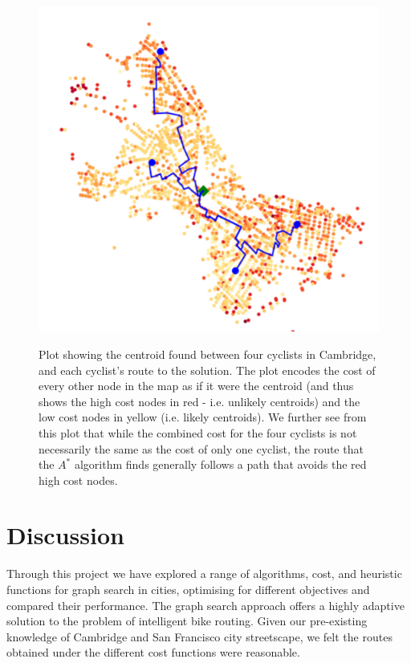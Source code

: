 \documentclass[11pt]{article}
\begin{document}
\begin{figure}[H]
\caption{Plot showing the centroid found between four cyclists in Cambridge, and each cyclist's route to the solution. The plot encodes the cost of every other node in the map as if it were the centroid (and thus shows the high cost nodes in red - i.e. unlikely centroids) and the low cost nodes in yellow (i.e. likely centroids). We further see from this plot that while the combined cost for the four cyclists is not necessarily the same as the cost of only one cyclist, the route that the $A^{*}$ algorithm finds generally follows a path that avoids the red high cost nodes.}
\includegraphics[width=1\textwidth]{../images/overall_plot.png}
\label{overall_plot}
\end{figure}

\section{Discussion}

Through this project we have explored a range of algorithms, cost, and heuristic functions for graph search in cities, optimising for different objectives and compared their performance.  The graph search approach offers a highly adaptive solution to the problem of intelligent bike routing. Given our pre-existing knowledge of Cambridge and San Francisco city streetscape, we felt the routes obtained under the different cost functions were reasonable. 
\end{document}
